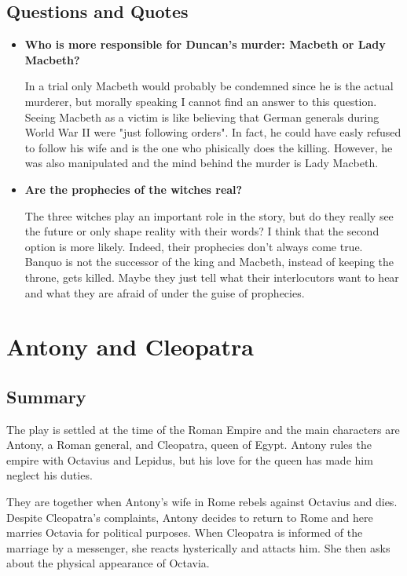 \documentclass[]{article}
\begin{document}
\subsection*{Questions and Quotes}
\begin{itemize}
    \item \textbf{Who is more responsible for Duncan's murder: Macbeth or Lady Macbeth?} \par
        In a trial only Macbeth would probably be condemned since he is the actual murderer, but morally speaking I cannot find an answer to this question. Seeing Macbeth as a victim is like believing that German generals during World War II were "just following orders". In fact, he could have easly refused to follow his wife and is the one who phisically does the killing. However, he was also manipulated and the mind behind the murder is Lady Macbeth.
    \item \textbf{Are the prophecies of the witches real?} \par
        The three witches play an important role in the story, but do they really see the future or only shape reality with their words? I think that the second option is more likely. Indeed, their prophecies don't always come true. Banquo is not the successor of the king and Macbeth, instead of keeping the throne, gets killed. Maybe they just tell what their interlocutors want to hear and what they are afraid of under the guise of prophecies.
\end{itemize}


\newpage
\section{Antony and Cleopatra}
\subsection*{Summary}
\hspace{1em}
The play is settled at the time of the Roman Empire and the main characters are Antony, a Roman general, and Cleopatra, queen of Egypt. Antony rules the empire with Octavius and Lepidus, but his love for the queen has made him neglect his duties.

They are together when Antony's wife in Rome rebels against Octavius and dies. Despite Cleopatra's complaints, Antony decides to return to Rome and here marries Octavia for political purposes. When Cleopatra is informed of the marriage by a messenger, she reacts hysterically and attacts him. She then asks about the physical appearance of Octavia.
\end{document}
